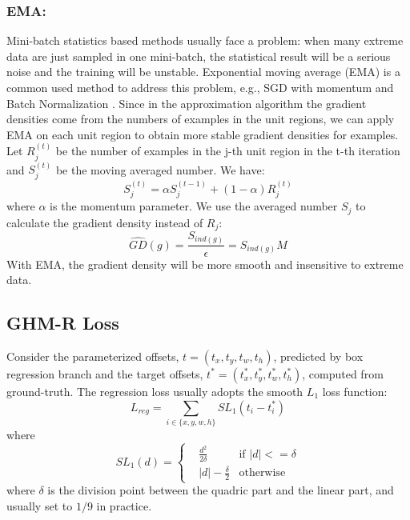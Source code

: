 \documentclass[letterpaper]{article} %
\begin{document}
\subsubsection{EMA:} Mini-batch statistics based methods usually face a problem: when many extreme data are just sampled in one mini-batch, the statistical result will be a serious noise and the training will be unstable. Exponential moving average (EMA) is a common used method to address this problem, e.g., SGD with momentum \cite{sgd} and Batch Normalization \cite{bn}. Since in the approximation algorithm the gradient densities come from the numbers of examples in the unit regions, we can apply EMA on each unit region to obtain more stable gradient densities for examples. Let $R_j^{(t)}$ be the number of examples in the j-th unit region in the t-th iteration and $S_j^{(t)}$ be the moving averaged number. We have:
\begin{equation}
   S_j^{(t)} = \alpha S_j^{(t-1)} + (1-\alpha) R_j^{(t)}
\end{equation}
where $\alpha$ is the momentum parameter. We use the averaged number $S_j$ to calculate the gradient density instead of $R_j$:
\begin{equation}
  \hat{GD}(g) = \frac{S_{ind(g)}}{\epsilon} = S_{ind(g)}M
\end{equation}
With EMA, the gradient density will be more smooth and insensitive to extreme data.


\subsection{GHM-R Loss}
Consider the parameterized offsets, $t = (t_x, t_y, t_w, t_h)$, predicted by box regression branch and the target offsets, $t^* = (t_x^*, t_y^*, t_w^*, t_h^*)$, computed from ground-truth. The regression loss usually adopts the smooth $L_1$ loss function:
\begin{equation}
\label{eq:reg1}
    L_{reg} = \sum_{i \in \{x,y,w,h\}}SL_1(t_i - t_i^*)
\end{equation}
where
\begin{equation}
\label{eq:smoothl1}
    SL_1(d) = \left\{ 
    \begin{aligned}
        & \frac{d^2}{2\delta} & \text{if }  |d| <= \delta \\
        & |d| - \frac{\delta}{2} & \text{otherwise}
    \end{aligned}
    \right.
\end{equation}
where $\delta$ is the division point between the quadric part and the linear part, and usually set to $1/9$ in practice. 
\end{document}
